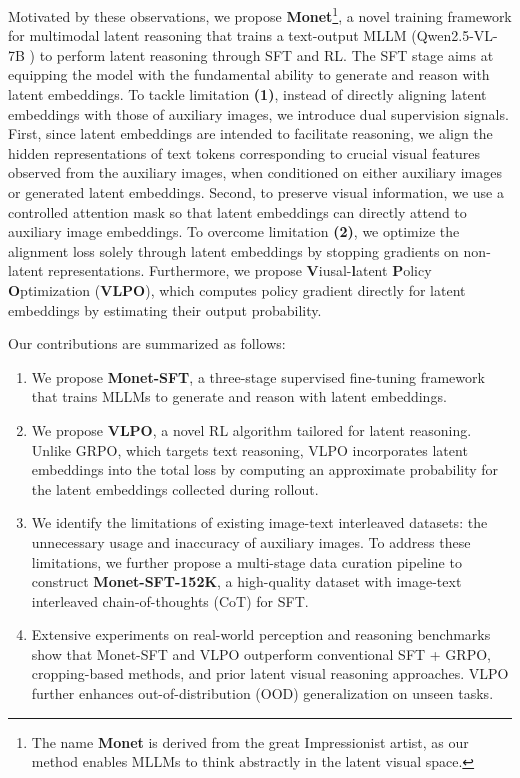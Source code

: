 Motivated by these observations, we propose \textbf{Monet}\footnote{The name \textbf{Monet} is derived from the great Impressionist artist, as our method enables MLLMs to think abstractly in the latent visual space.}, a novel training framework for multimodal latent reasoning  that trains a text-output MLLM (Qwen2.5-VL-7B \citep{bai2025qwen2}) to perform latent reasoning through SFT and RL. The SFT stage aims at equipping the model with the fundamental ability to generate and reason with latent embeddings. To tackle limitation \textbf{(1)}, instead of directly aligning latent embeddings with those of auxiliary images, we introduce dual supervision signals. First, since latent embeddings are intended to facilitate reasoning, we align the hidden representations of text tokens corresponding to crucial visual features observed from the auxiliary images, when conditioned on either auxiliary images or generated latent embeddings. Second, to preserve visual information, we use a controlled attention mask so that latent embeddings can directly attend to auxiliary image embeddings. To overcome limitation \textbf{(2)}, we optimize the alignment loss solely through latent embeddings by stopping gradients on non-latent representations. Furthermore, we propose \textbf{V}iusal-\textbf{l}atent \textbf{P}olicy \textbf{O}ptimization (\textbf{VLPO}), which computes policy gradient directly for latent embeddings by estimating their output probability.

Our contributions are summarized as follows:
\begin{enumerate}
    \item We propose \textbf{Monet-SFT}, a three-stage supervised fine-tuning framework that trains MLLMs to generate and reason with latent embeddings.
    \item We propose \textbf{VLPO}, a novel RL algorithm tailored for latent reasoning. Unlike GRPO, which targets text reasoning, VLPO incorporates latent embeddings into the total loss by computing an approximate probability for the latent embeddings collected during rollout.
    \item We identify the limitations of existing image-text interleaved datasets: the unnecessary usage and inaccuracy of auxiliary images. To address these limitations, we further propose a multi-stage data curation pipeline to construct \textbf{Monet-SFT-152K}, a high-quality dataset with image-text interleaved chain-of-thoughts (CoT) for SFT.
    \item Extensive experiments on real-world perception and reasoning benchmarks show that Monet-SFT and VLPO outperform conventional SFT + GRPO, cropping-based methods, and prior latent visual reasoning approaches. VLPO further enhances out-of-distribution (OOD) generalization on unseen tasks.
\end{enumerate}

